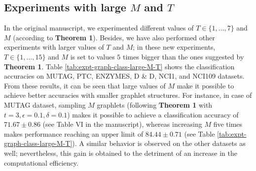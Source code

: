 \documentclass[journal]{IEEEtran}
\theoremstyle{definition}
\newcommand{\tab}[1]{Table \ref{#1}}
\begin{document}
\subsection{Experiments with large $M$ and $T$}

In the original manuscript, we experimented different values of $T\in\lbrace 1,\ldots, 7\rbrace$ and $M$ (according to \textbf{Theorem 1}). Besides, we have also performed other experiments with larger values of $T$ and $M$; in these new experiments, $T \in \{1,\dots,15\}$ and $M$ is set to values $5$ times bigger than the ones suggested by \textbf{Theorem 1}. \tab{tab:expt-graph-class-large-M-T} shows the classification accuracies on MUTAG, PTC, ENZYMES, D \& D, NCI1, and NCI109 datasets. From these results, it can be seen that large values of $M$ make it possible to achieve better accuracies with smaller graphlet structures. For instance, in case of MUTAG dataset, sampling $M$ graphlets (following \textbf{Theorem 1} with $t=3, \epsilon=0.1, \delta=0.1$) makes it possible to achieve a classification accuracy of $71.67 \pm 0.86$ (see Table VI in the manuscript), whereas increasing $M$ five times makes performance reaching an upper limit of $84.44 \pm 0.71$ (see \tab{tab:expt-graph-class-large-M-T}). A similar behavior is observed on the other datasets as well; nevertheless, this gain is obtained to the detriment of an increase in the computational efficiency.
\end{document}
